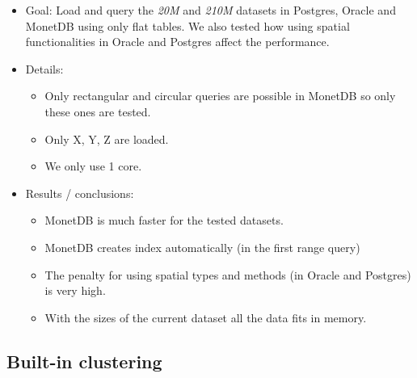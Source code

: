 \documentclass[a4paper,11pt]{article}
\begin{document}
\begin{itemize}
	\item Goal: 	Load and query the \textit{20M} and \textit{210M} datasets in Postgres, Oracle and MonetDB using only flat tables. We also tested how using spatial functionalities in Oracle and Postgres affect the performance.
	\item Details: 
	\begin{itemize}
		\item Only rectangular and circular queries are possible in MonetDB so only these ones are tested.
		\item Only X, Y, Z are loaded.
		\item We only use 1 core.
	\end{itemize}				
	\item Results / conclusions: 
	\begin{itemize}
		\item MonetDB is much faster for the tested datasets.
		\item MonetDB creates index automatically (in the first range query)
		\item The penalty for using spatial types and methods (in Oracle and Postgres) is very high.
		\item With the sizes of the current dataset all the data fits in memory.
	\end{itemize}			
\end{itemize}

\subsection{Built-in clustering}
\end{document}
